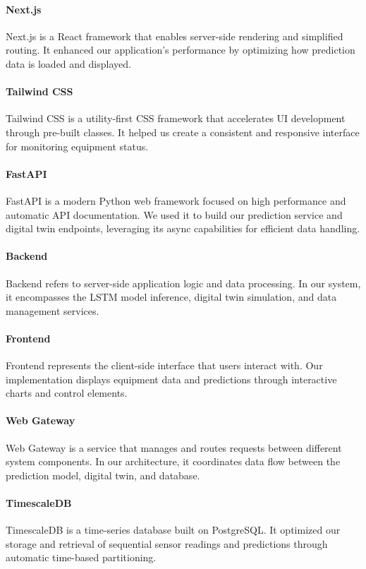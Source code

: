 \paragraph{Next.js} Next.js is a React framework that enables server-side rendering and simplified routing. It enhanced our application's performance by optimizing how prediction data is loaded and displayed.

\paragraph{Tailwind CSS} Tailwind CSS is a utility-first CSS framework that accelerates UI development through pre-built classes. It helped us create a consistent and responsive interface for monitoring equipment status.

\paragraph{FastAPI} FastAPI is a modern Python web framework focused on high performance and automatic API documentation. We used it to build our prediction service and digital twin endpoints, leveraging its async capabilities for efficient data handling.

\paragraph{Backend} Backend refers to server-side application logic and data processing. In our system, it encompasses the LSTM model inference, digital twin simulation, and data management services.

\paragraph{Frontend} Frontend represents the client-side interface that users interact with. Our implementation displays equipment data and predictions through interactive charts and control elements.

\paragraph{Web Gateway} Web Gateway is a service that manages and routes requests between different system components. In our architecture, it coordinates data flow between the prediction model, digital twin, and database.

\paragraph{TimescaleDB} TimescaleDB is a time-series database built on PostgreSQL. It optimized our storage and retrieval of sequential sensor readings and predictions through automatic time-based partitioning.

